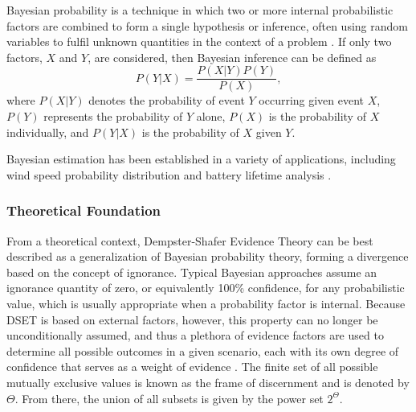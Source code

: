 \documentclass[12pt]{uthesis-v12}  %
\begin{document}
Bayesian probability is a technique in which two or more internal probabilistic factors are combined to form a single hypothesis or inference, often using random variables to fulfil unknown quantities in the context of a problem \cite{rish}. If only two factors, $X$ and $Y$, are considered, then Bayesian inference can be defined as
\begin{equation}
P(Y|X)=\frac{P(X|Y)P(Y)}{P(X)},
\label{bayes1}
\end{equation}
where $P(X|Y)$ denotes the probability of event $Y$ occurring given event $X$, $P(Y)$ represents the probability of $Y$ alone, $P(X)$ is the probability of $X$ individually, and $P(Y|X)$ is the probability of $X$ given $Y$. 

Bayesian estimation has been established in a variety of applications, including wind speed probability distribution \cite{chiodo1} and battery lifetime analysis \cite{chiodo2}. 

\subsubsection{Theoretical Foundation}

From a theoretical context, Dempster-Shafer Evidence Theory can be best described as a generalization of Bayesian probability theory, forming a divergence based on the concept of ignorance. Typical Bayesian approaches assume an ignorance quantity of zero, or equivalently 100\% confidence, for any probabilistic value, which is usually appropriate when a probability factor is internal. Because DSET is based on external factors, however, this property can no longer be unconditionally assumed, and thus a plethora of evidence factors are used to determine all possible outcomes in a given scenario, each with its own degree of confidence that serves as a weight of evidence \cite{shafer}. The finite set of all possible mutually exclusive values is known as the frame of discernment and is denoted by $\Theta$. From there, the union of all subsets is given by the power set $2^\Theta$.
\end{document}
